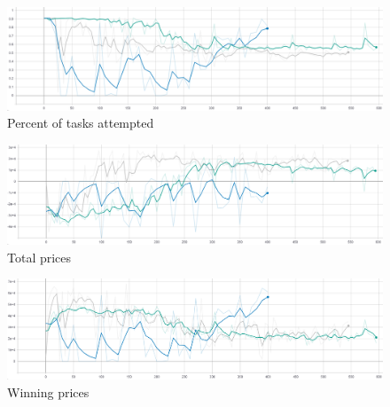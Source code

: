 \begin{figure}[h]
    \centering
    \includegraphics[width=15cm]{figures/env_training_fig/percent_tasks.png}
    \caption{Percent of tasks attempted}
    \label{fig:env_percent_tasks}
\end{figure}

\begin{figure}[h]
    \centering
    \includegraphics[width=15cm]{figures/env_training_fig/total_prices.png}
    \caption{Total prices}
    \label{fig:env_total_prices}
\end{figure}

\begin{figure}[h]
    \centering
    \includegraphics[width=15cm]{figures/env_training_fig/total_winning_prices.PNG}
    \caption{Winning prices}
    \label{fig:env_winning_prices}
\end{figure}

